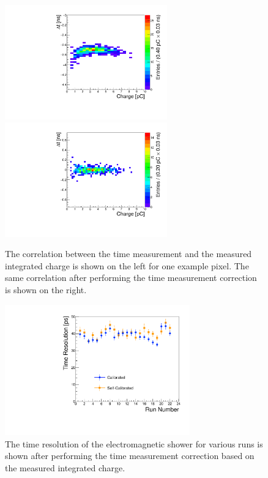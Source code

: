 \begin{figure}[h] 
\centering
\includegraphics[width=7cm]{Images/dt-int/dtint30_o22.pdf}
\includegraphics[width=7cm]{Images/dt-int/dtint30_c22.pdf} 
\caption{The correlation between the time measurement and the measured integrated charge is
shown on the left for one example pixel. The same correlation after performing
the time measurement correction is shown on the right. } 
\label{fig:dt-int}
\end{figure} 

\begin{figure}[h] 
\centering
\includegraphics[width=8cm]{Images/calibtres/timerescalib.pdf} 
\caption{ The time resolution of the electromagnetic shower for various runs is
shown after performing the time measurement correction based on the measured
integrated charge. } 
\label{fig:calib} 
\end{figure} 

